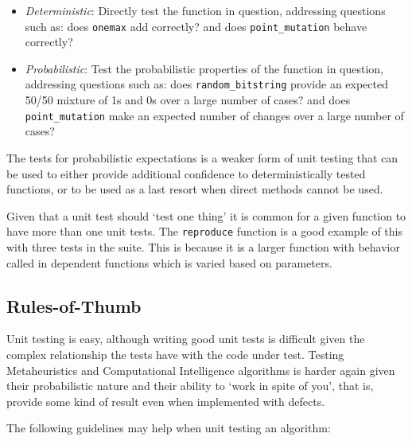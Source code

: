 \begin{itemize}
	\item \emph{Deterministic}: Directly test the function in question, addressing questions such as: does \texttt{onemax} add correctly? and does \texttt{point\_mutation} behave correctly?
	\item \emph{Probabilistic}: Test the probabilistic properties of the function in question, addressing questions such as: does \texttt{random\_bitstring} provide an expected 50/50 mixture of 1s and 0s over a large number of cases? and does \texttt{point\_mutation} make an expected number of changes over a large number of cases?
\end{itemize}

The tests for probabilistic expectations is a weaker form of unit testing that can be used to either provide additional confidence to deterministically tested functions, or to be used as a last resort when direct methods cannot be used.

Given that a unit test should `test one thing' it is common for a given function to have more than one unit tests. The \texttt{reproduce} function is a good example of this with three tests in the suite. This is because it is a larger function with behavior called in dependent functions which is varied based on parameters.



%
%
\subsection{Rules-of-Thumb}
\label{sec:suggestions}
Unit testing is easy, although writing good unit tests is difficult given the complex relationship the tests have with the code under test. Testing Metaheuristics and Computational Intelligence algorithms is harder again given their probabilistic nature and their ability to `work in spite of you', that is, provide some kind of result even when implemented with defects.

The following guidelines may help when unit testing an algorithm:

